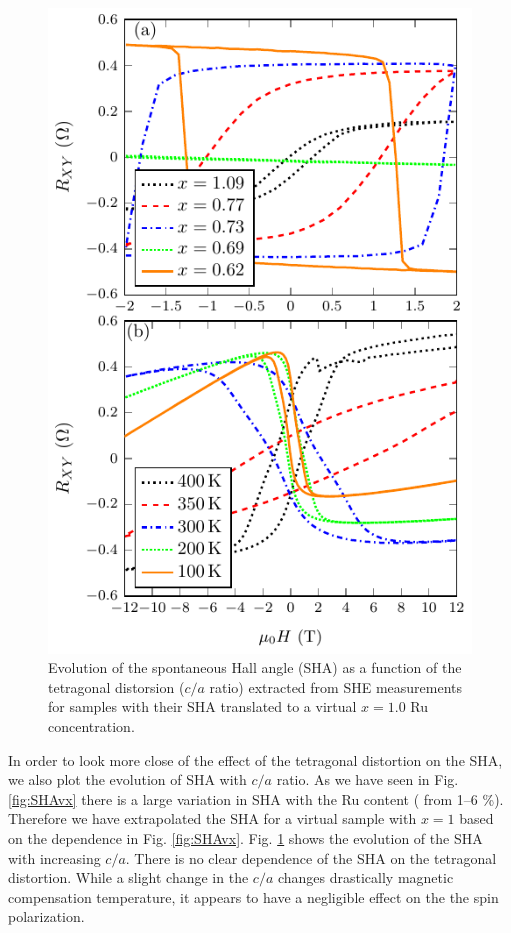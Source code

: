 \documentclass[reprint,aip,apl,floatfix,linenumbers,superscriptaddress]{revtex4-1}
\begin{document}
\begin{figure}
\includegraphics[width=1.0\columnwidth]{Transport-Fig2.pdf}
\caption{Evolution of the spontaneous Hall angle (SHA) as a function of the 
tetragonal distorsion ($c/a$ ratio) extracted from SHE measurements for 
samples with their SHA translated to a virtual $x=1.0$ Ru concentration.}
\label{fig:SHAvca}
\end{figure}

In order to look more close of the effect of the tetragonal distortion on the 
SHA, we also plot the evolution of SHA with $c/a$ ratio. As we have seen in 
Fig. \ref{fig:SHAvx} there is a large variation in SHA with the Ru content (
from \numrange{1}{6} \%). Therefore we have extrapolated the SHA for a 
virtual sample with $x=1$ based on the dependence in Fig. \ref{fig:SHAvx}. 
Fig. \ref{fig:SHAvca} shows the evolution of the SHA with increasing $c/a$. 
There is no clear dependence of the SHA on the tetragonal distortion. While a 
slight change in the $c/a$ changes drastically magnetic compensation 
temperature, it appears to have a negligible effect on the the spin 
polarization.
\end{document}
